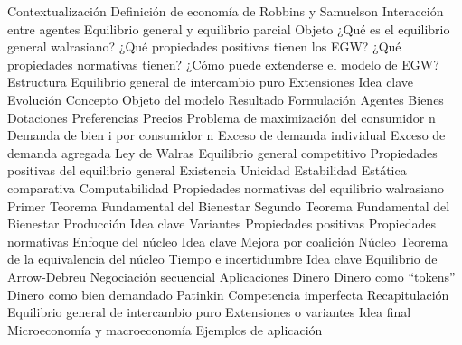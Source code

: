 \documentclass{nuevotema}
\begin{document}
\begin{esquema}[enumerate]
	\1[] 
		\2 Contextualización
			\3 Definición de economía de Robbins y Samuelson
			\3 Interacción entre agentes
			\3 Equilibrio general y equilibrio parcial
		\2 Objeto
			\3 ¿Qué es el equilibrio general walrasiano?
			\3 ¿Qué propiedades positivas tienen los EGW?
			\3 ¿Qué propiedades normativas tienen?
			\3 ¿Cómo puede extenderse el modelo de EGW?
		\2 Estructura
			\3 Equilibrio general de intercambio puro
			\3 Extensiones
	\1 
		\2 Idea clave
			\3 Evolución
			\3 Concepto
			\3 Objeto del modelo
			\3 Resultado
		\2 Formulación
			\3 Agentes
			\3 Bienes
			\3 Dotaciones
			\3 Preferencias
			\3 Precios
			\3 Problema de maximización del consumidor n
			\3 Demanda de bien i por consumidor n
			\3 Exceso de demanda individual
			\3 Exceso de demanda agregada
			\3 Ley de Walras
			\3 Equilibrio general competitivo
		\2 Propiedades positivas del equilibrio general
			\3 Existencia
			\3 Unicidad
			\3 Estabilidad
			\3 Estática comparativa
			\3 Computabilidad
		\2 Propiedades normativas del equilibrio walrasiano
			\3 Primer Teorema Fundamental del Bienestar
			\3 Segundo Teorema Fundamental del Bienestar
	\1 
		\2 Producción
			\3 Idea clave
			\3 Variantes
			\3 Propiedades positivas
			\3 Propiedades normativas
		\2 Enfoque del núcleo
			\3 Idea clave
			\3 Mejora por coalición
			\3 Núcleo
			\3 Teorema de la equivalencia del núcleo
		\2 Tiempo e incertidumbre
			\3 Idea clave
			\3 Equilibrio de Arrow-Debreu
			\3 Negociación secuencial
			\3 Aplicaciones
		\2 Dinero
			\3 Dinero como ``tokens''
			\3 Dinero como bien demandado
			\3 Patinkin
			\3 Competencia imperfecta
	\1[] 
		\2 Recapitulación
			\3 Equilibrio general de intercambio puro
			\3 Extensiones o variantes
		\2 Idea final
			\3 Microeconomía y macroeconomía
			\3 Ejemplos de aplicación

\end{esquema}

\esquemalargo
\end{document}
